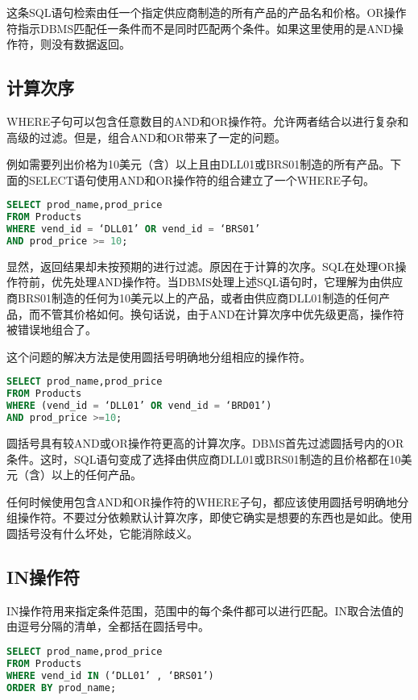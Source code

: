 这条SQL语句检索由任一个指定供应商制造的所有产品的产品名和价格。OR操作符指示DBMS匹配任一条件而不是同时匹配两个条件。如果这里使用的是AND操作符，则没有数据返回。
\subsection{计算次序}

WHERE子句可以包含任意数目的AND和OR操作符。允许两者结合以进行复杂和高级的过滤。但是，组合AND和OR带来了一定的问题。

例如需要列出价格为10美元（含）以上且由DLL01或BRS01制造的所有产品。下面的SELECT语句使用AND和OR操作符的组合建立了一个WHERE子句。

\begin{lstlisting}[language=SQL]
SELECT prod_name,prod_price
FROM Products
WHERE vend_id = ‘DLL01’ OR vend_id = ‘BRS01’ 
AND prod_price >= 10;
\end{lstlisting}

显然，返回结果却未按预期的进行过滤。原因在于计算的次序。SQL在处理OR操作符前，优先处理AND操作符。当DBMS处理上述SQL语句时，它理解为由供应商BRS01制造的任何为10美元以上的产品，或者由供应商DLL01制造的任何产品，而不管其价格如何。换句话说，由于AND在计算次序中优先级更高，操作符被错误地组合了。

这个问题的解决方法是使用圆括号明确地分组相应的操作符。


\begin{lstlisting}[language=SQL]
SELECT prod_name,prod_price
FROM Products
WHERE (vend_id = ‘DLL01’ OR vend_id = ‘BRD01’) 
AND prod_price >=10;
\end{lstlisting}

圆括号具有较AND或OR操作符更高的计算次序。DBMS首先过滤圆括号内的OR条件。这时，SQL语句变成了选择由供应商DLL01或BRS01制造的且价格都在10美元（含）以上的任何产品。

任何时候使用包含AND和OR操作符的WHERE子句，都应该使用圆括号明确地分组操作符。不要过分依赖默认计算次序，即使它确实是想要的东西也是如此。使用圆括号没有什么坏处，它能消除歧义。
\subsection{IN操作符}

IN操作符用来指定条件范围，范围中的每个条件都可以进行匹配。IN取合法值的由逗号分隔的清单，全都括在圆括号中。

\begin{lstlisting}[language=SQL]
SELECT prod_name,prod_price
FROM Products
WHERE vend_id IN (‘DLL01’ , ‘BRS01’)
ORDER BY prod_name;
\end{lstlisting}

